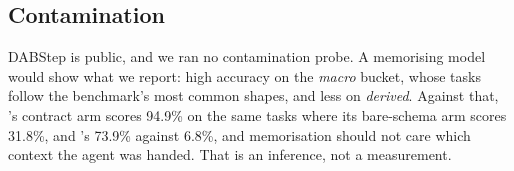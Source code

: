 \subsection{Contamination}

DABStep is public, and we ran no contamination probe. A memorising model
would show what we report: high accuracy on the \emph{macro} bucket, whose
tasks follow the benchmark's most common shapes, and less on \emph{derived}.
Against that, \mGPT{}'s contract arm scores 94.9\% on the same tasks where
its bare-schema arm scores 31.8\%, and \mSON{}'s 73.9\% against 6.8\%, and
memorisation should not care which context the agent was handed. That is an
inference, not a measurement.

